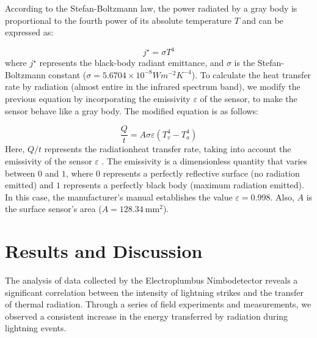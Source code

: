 \documentclass[english]{cenarticle}
\begin{document}
According to the Stefan-Boltzmann law, the power radiated by a gray body is proportional to the fourth power of its absolute temperature $T$ and can be expressed as:

\vspace{-10mm}
\begin{equation}\label{StefanBoltzmannLaw}
  j^{\star}=\sigma T^{4}
\end{equation}
%
\noindent where $j^{\star}$ represents the black-body radiant emittance, and $\sigma$ is the Stefan-Boltzmann constant ($\sigma=5.6704\times10^{-8} Wm^{-2}K^{-4}$).
%
To calculate the heat transfer rate by radiation (almost entire in the infrared spectrum band), we modify the previous equation by incorporating the emissivity $\varepsilon$ of the sensor, to make the sensor behave like a gray body. The modified equation is as follows:

\vspace{-5mm}
\begin{equation}
  \frac{Q}{t}=A\sigma\varepsilon (T_{v}^{4} - T_{a}^{4})
\end{equation}
%
Here, $Q \slash t$ represents the radiationheat transfer rate, taking into account the emissivity of the sensor $\varepsilon$ . The emissivity is a dimensionless quantity that varies between $0$ and $1$, where $0$ represents a perfectly reflective surface (no radiation emitted) and $1$ represents a perfectly black body (maximum radiation emitted). In this case, the manufacturer's manual establishes the value $\varepsilon = 0.998$. Also, $A$ is the surface sensor's area ($A=\SI{128.34}{\milli\meter^2}$).

\section{Results and Discussion}

The analysis of data collected by the Electroplumbus Nimbodetector reveals a significant correlation between the intensity of lightning strikes and the transfer of thermal radiation. Through a series of field experiments and measurements, we observed a consistent increase in the energy transferred by radiation during lightning events.


 
\end{document}
